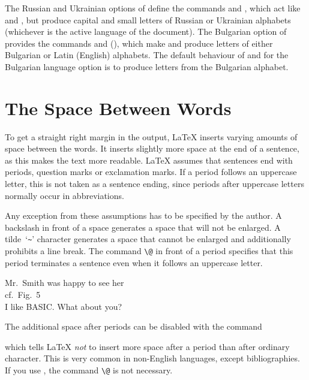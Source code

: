 The Russian and Ukrainian options of  define the commands 
and , which act like  and , but produce capital
and small letters of Russian or Ukrainian alphabets (whichever is the
active language of the document). The Bulgarian option of  
provides the commands  and  (), which
make  and  produce letters of either
Bulgarian or Latin (English) alphabets. The default behaviour of
  and  for the Bulgarian language option is to
produce letters from the Bulgarian alphabet. 


\section{The Space Between Words}

To get a straight right margin in the output, \LaTeX{} inserts varying
amounts of space between the words. It inserts slightly more space at
the end of a sentence, as this makes the text more readable.  \LaTeX{}
assumes that sentences end with periods, question marks or exclamation
marks. If a period follows an uppercase letter, this is not taken as a
sentence ending, since periods after uppercase letters normally occur in
abbreviations.

Any exception from these assumptions has to be specified by the
author. A backslash in front of a space generates a space that will
not be enlarged. A tilde~`\verb|~|' character generates a space that cannot be
enlarged and additionally prohibits a line break. The command
\verb|\@| in front of a period specifies that this period terminates a
sentence even when it follows an uppercase letter.
  

\begin{example}
Mr.~Smith was happy to see her\\
cf.~Fig.~5\\
I like BASIC\@. What about you?
\end{example}

The additional space after periods can be disabled with the command
\begin{lscommand}
\end{lscommand}
\noindent which tells \LaTeX{} \emph{not} to insert more space after a
period than after ordinary character. This is very common in
non-English languages, except bibliographies. If you use
, the command \verb|\@| is not necessary.

